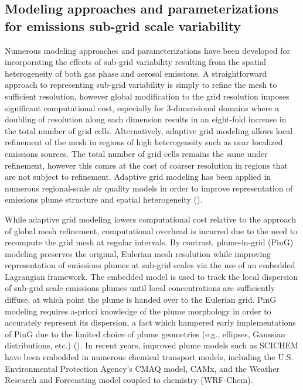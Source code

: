 \subsection{Modeling approaches and parameterizations for emissions sub-grid scale variability}

Numerous modeling approaches and parameterizations have been developed for incorporating the effects of sub-grid variability resulting from the spatial heterogeneity of both gas phase and aerosol emissions. A straightforward approach to representing sub-grid variability is simply to refine the mesh to sufficient resolution, however global modification to the grid resolution imposes significant computational cost, especially for 3-dimensional domains where a doubling of resolution along each dimension results in an eight-fold increase in the total number of grid cells. Alternatively, adaptive grid modeling allows local refinement of the mesh in regions of high heterogeneity such as near localized emissions sources. The total number of grid cells remains the same under refinement, however this comes at the cost of coarser resolution in regions that are not subject to refinement. Adaptive grid modeling has been applied in numerous regional-scale air quality models in order to improve representation of emissions plume structure and spatial heterogeneity (\cite{karamchandani_sub-grid_2011}).  

While adaptive grid modeling lowers computational cost relative to the approach of global mesh refinement, computational overhead is incurred due to the need to recompute the grid mesh at regular intervals. By contrast, plume-in-grid (PinG) modeling preserves the original, Eulerian mesh resolution while improving representation of emissions plumes at sub-grid scales via the use of an embedded Lagrangian framework. The embedded model is used to track the local dispersion of sub-grid scale emissions plumes until local concentrations are sufficiently diffuse, at which point the plume is handed over to the Eulerian grid. PinG modeling requires a-priori knowledge of the plume morphology in order to accurately represent its dispersion, a fact which hampered early implementations of PinG due to the limited choice of plume geometries (e.g., ellipses, Gaussian distributions, etc.) (\cite{karamchandani_sub-grid_2011}). In recent years, improved plume models such as SCICHEM have been embedded in numerous chemical transport models, including the U.S. Environmental Protection Agency's CMAQ model, CAMx, and the Weather Research and Forecasting model coupled to chemistry (WRF-Chem). 

